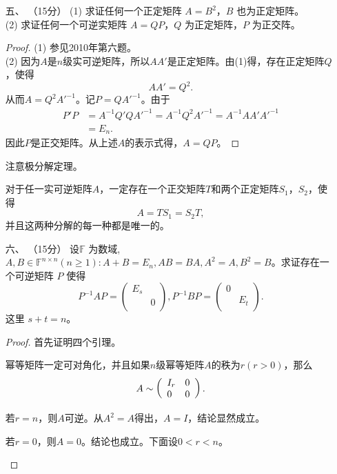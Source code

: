 \begin{enumerate}[1~]
\item[五、]（15分）
(1) 求证任何一个正定矩阵 $A = B^2$，$B$ 也为正定矩阵。\\
(2) 求证任何一个可逆实矩阵 $A = QP$，$Q$ 为正定矩阵，$P$ 为正交阵。
\begin{proof}
(1) 参见2010年第六题。\\
(2) 
因为$A$是$n$级实可逆矩阵，所以$AA'$是正定矩阵。由(1)得，存在正定矩阵$Q$，使得\[
AA'= Q^2.
\]
从而$A=Q^2{A'}^{-1}$。记$P=Q{A'}^{-1}$。由于\begin{align*}
P'P&=A^{-1}Q'Q{A'}^{-1}=A^{-1}Q^2{A'}^{-1}=A^{-1}AA'{A'}^{-1}\\
&=E_n.
\end{align*}
因此$P$是正交矩阵。从上述$A$的表示式得，$A=QP$。
\end{proof}
\begin{remark}
注意极分解定理。
\begin{theorem}[极分解定理]
对于任一实可逆矩阵$A$，一定存在一个正交矩阵$T$和两个正定矩阵$S_1$，$S_2$，使得\[
A=TS_1= S_2T,
\]
并且这两种分解的每一种都是唯一的。
\end{theorem}
\end{remark}

\item[六、]（15分）
设$\mathbb{F}$ 为数域, $A , B \in \mathbb { F } ^ { n 
\times n } ( n \geq 1 ) : A + B = E _ { n } , A B = B A , A ^ 
{ 2 } = A , B ^ { 2 } = B$。求证存在一个可逆矩阵 $P$ 使得\[
P ^ { - 1 } A P = \left( \begin{matrix}
	E_s&		\\
	&		0\\
\end{matrix} \right)  , 
P ^ { - 1 } B P = \left( \begin{matrix}
	0&		\\
	&		E_t\\
\end{matrix} \right) .
\]
这里 $s + t = n$。
\begin{proof}
首先证明四个引理。
\begin{lemma}
幂等矩阵一定可对角化，并且如果$n$级幂等矩阵$A$的秩为$r (r>0)$，那么\[
A \sim \left( \begin{array} { l l } { I _ { r } } & { 0 } \\ { 0 } & { 0 } \end{array} \right).
\]
\end{lemma}
\begin{subproof}
若$r=n$，则$A$可逆。从$A^2=A$得出，$A=I$，结论显然成立。

若$r=0$，则$A=0$。结论也成立。下面设$0<r<n$。


\end{subproof}
\end{proof}
\end{enumerate}
